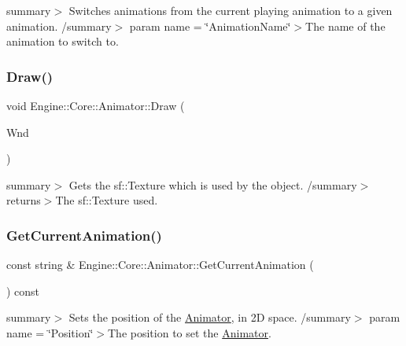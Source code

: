 summary$>$ Switches animations from the current playing animation to a given animation. /summary$>$ param name = \char`\"{}\+Animation\+Name\char`\"{}$>$The name of the animation to switch to.\mbox{\label{class_engine_1_1_core_1_1_animator_aefd22a2fa9e388be63a993cb7aa1875e}} 
\subsubsection{\texorpdfstring{Draw()}{Draw()}}
{\footnotesize\ttfamily void Engine\+::\+Core\+::\+Animator\+::\+Draw (\begin{DoxyParamCaption}\item[{Render\+Window $\ast$}]{Wnd }\end{DoxyParamCaption})}

summary$>$ Gets the sf\+::\+Texture which is used by the object. /summary$>$ returns$>$The sf\+::\+Texture used.\mbox{\label{class_engine_1_1_core_1_1_animator_a107b26ce06d5429db241cb6fe8ddef44}} 
\subsubsection{\texorpdfstring{Get\+Current\+Animation()}{GetCurrentAnimation()}}
{\footnotesize\ttfamily const string \& Engine\+::\+Core\+::\+Animator\+::\+Get\+Current\+Animation (\begin{DoxyParamCaption}\item[{void}]{ }\end{DoxyParamCaption}) const}

summary$>$ Sets the position of the \hyperlink{class_engine_1_1_core_1_1_animator}{Animator}, in 2D space. /summary$>$ param name = \char`\"{}\+Position\char`\"{}$>$The position to set the \hyperlink{class_engine_1_1_core_1_1_animator}{Animator}.\mbox{\label{class_engine_1_1_core_1_1_animator_adfbba33a29a643ed447ca292705e4e00}} 
